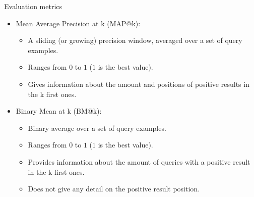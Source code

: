 \begin{frame}{Evaluation metrics}

    \begin{itemize}
        \item Mean Average Precision at k (MAP@k): 
        \begin{itemize}
            \item A sliding (or growing) precision window, averaged over a set of query examples.
            \item Ranges from $0$ to $1$ ($1$ is the best value).
            \item Gives information about the amount and positions of positive results in the k first ones.
        \end{itemize}
        \item Binary Mean at k (BM@k):
        \begin{itemize}
            \item Binary average over a set of query examples.
            \item Ranges from $0$ to $1$ ($1$ is the best value).
            \item Provides information about the amount of queries with a positive result in the k first ones.
            \item Does not give any detail on the positive result position.
        \end{itemize}
    \end{itemize}

\end{frame}